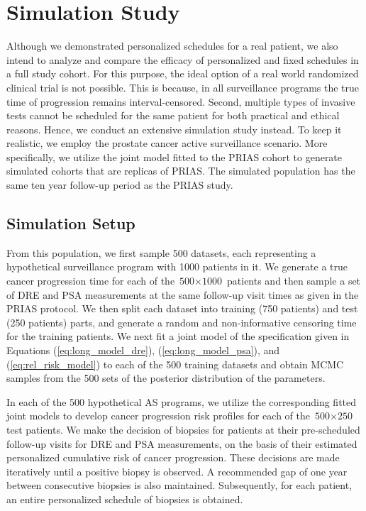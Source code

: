 \section{Simulation Study}
\label{sec:sim_study}
Although we demonstrated personalized schedules for a real patient, we also intend to analyze and compare the efficacy of personalized and fixed schedules in a full study cohort. For this purpose, the ideal option of a real world randomized clinical trial is not possible. This is because, in all surveillance programs the true time of progression remains interval-censored. Second, multiple types of invasive tests cannot be scheduled for the same patient for both practical and ethical reasons. Hence, we conduct an extensive simulation study instead. To keep it realistic, we employ the prostate cancer active surveillance scenario. More specifically, we utilize the joint model fitted to the PRIAS cohort to generate simulated cohorts that are replicas of PRIAS. The simulated population has the same ten year follow-up period as the PRIAS study.

\subsection{Simulation Setup}
From this population, we first sample 500 datasets, each representing a hypothetical surveillance program with 1000 patients in it. We generate a true cancer progression time for each of the ${\mbox{500} \times \mbox{1000}}$ patients and then sample a set of DRE and PSA measurements at the same follow-up visit times as given in the PRIAS protocol. We then split each dataset into training (750 patients) and test (250 patients) parts, and generate a random and non‐informative censoring time for the training patients. We next fit a joint model of the specification given in Equations (\ref{eq:long_model_dre}), (\ref{eq:long_model_psa}), and (\ref{eq:rel_risk_model}) to each of the 500 training datasets and obtain MCMC samples from the 500 sets of the posterior distribution of the parameters.

In each of the 500 hypothetical AS programs, we utilize the corresponding fitted joint models to develop cancer progression risk profiles for each of the ${\mbox{500} \times \mbox{250}}$ test patients. We make the decision of biopsies for patients at their pre-scheduled follow-up visits for DRE and PSA measurements, on the basis of their estimated personalized cumulative risk of cancer progression. These decisions are made iteratively until a positive biopsy is observed. A recommended gap of one year between consecutive biopsies\cite{bokhorst2015compliance} is also maintained. Subsequently, for each patient, an entire personalized schedule of biopsies is obtained.

